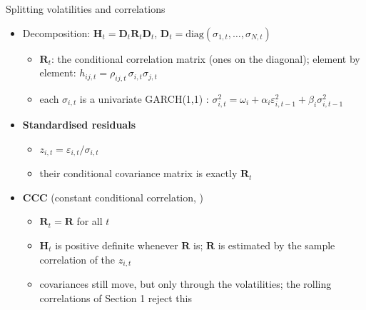 \begin{frame}{Splitting volatilities and correlations}
\itemsize{\small}
\begin{itemize}
    \item Decomposition: $\mathbf{H}_t = \mathbf{D}_t\mathbf{R}_t\mathbf{D}_t$, \quad $\mathbf{D}_t = \mathrm{diag}(\sigma_{1,t}, \dots, \sigma_{N,t})$
    \begin{itemize}
        \item $\mathbf{R}_t$: the conditional correlation matrix (ones on the diagonal); element by element: $h_{ij,t} = \rho_{ij,t}\,\sigma_{i,t}\sigma_{j,t}$
        \item each $\sigma_{i,t}$ is a univariate GARCH(1,1) : $\sigma_{i,t}^2 = \omega_i + \alpha_i\varepsilon_{i,t-1}^2 + \beta_i\sigma_{i,t-1}^2$
    \end{itemize}
    \item \textbf{Standardised residuals}
    \begin{itemize}
        \item $z_{i,t} = \varepsilon_{i,t}/\sigma_{i,t}$
        \item their conditional covariance matrix is exactly $\mathbf{R}_t$
    \end{itemize}
    \item \textbf{CCC} (constant conditional correlation, )
    \begin{itemize}
        \item $\mathbf{R}_t = \mathbf{R}$ for all $t$
        \item $\mathbf{H}_t$ is positive definite whenever $\mathbf{R}$ is; $\mathbf{R}$ is estimated by the sample correlation of the $z_{i,t}$
        \item covariances still move, but only through the volatilities; the rolling correlations of Section 1 reject this
    \end{itemize}
\end{itemize}
\end{frame}

